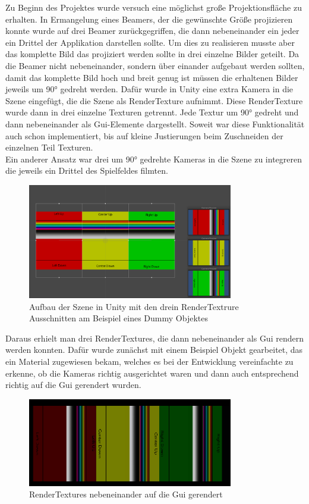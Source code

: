
Zu Beginn des Projektes wurde versuch eine möglichst große Projektionsfläche zu erhalten. In Ermangelung eines Beamers, der die gewünschte Größe projizieren konnte wurde auf drei Beamer zurückgegriffen, die dann nebeneinander ein jeder ein Drittel der Applikation darstellen sollte. Um dies zu realisieren musste aber das komplette Bild das projiziert werden sollte in drei einzelne Bilder geteilt. Da die Beamer nicht nebeneinander, sondern über einander aufgebaut werden sollten, damit das komplette Bild hoch und breit genug ist müssen die erhaltenen Bilder jeweils um 90° gedreht werden. Dafür wurde in Unity eine extra Kamera in die Szene eingefügt, die die Szene als RenderTexture aufnimmt. Diese RenderTexture wurde dann in drei einzelne Texturen getrennt. Jede Textur um 90° gedreht und dann nebeneinander als Gui-Elemente dargestellt. Soweit war diese Funktionalität auch schon implementiert, bis auf kleine Justierungen beim Zuschneiden der einzelnen Teil Texturen. \\
Ein anderer Ansatz war drei um 90° gedrehte Kameras in die Szene zu integreren die jeweils ein Drittel des Spielfeldes filmten. 
\begin{figure}[h]
	\centering
		\includegraphics[width=0.8\textwidth]{images/RenderTextureBeispielSzene.PNG}
	\caption{Aufbau der Szene in Unity mit den drein RenderTextrure Ausschnitten am Beispiel eines Dummy Objektes}
	\label{fig:RenderTextureBeispielSzene}
\end{figure}
Daraus erhielt man drei RenderTextures, die dann nebeneinander als Gui rendern werden konnten. Dafür wurde zunächst mit einem Beispiel Objekt gearbeitet, das ein Material zugewiesen bekam, welches es bei der Entwicklung vereinfachte zu erkenne, ob die Kameras richtig ausgerichtet waren und dann auch entsprechend richtig auf die Gui gerendert wurden. 
\begin{figure}[h]
	\centering
		\includegraphics[width=0.8\textwidth]{images/RenderTexturesAlsGui.PNG}
	\caption{RenderTextures nebeneinander auf die Gui gerendert}
	\label{fig:RenderTexturesAlsGui}
\end{figure}\\
